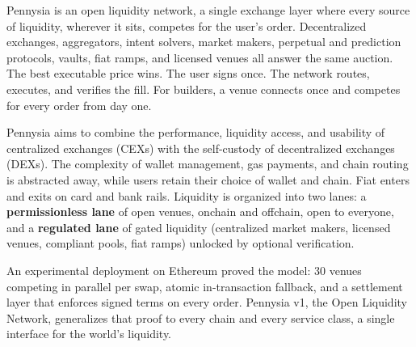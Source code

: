 Pennysia is an open liquidity network, a single exchange layer where every source of liquidity, wherever it sits, competes for the user's order. Decentralized exchanges, aggregators, intent solvers, market makers, perpetual and prediction protocols, vaults, fiat ramps, and licensed venues all answer the same auction. The best executable price wins. The user signs once. The network routes, executes, and verifies the fill. For builders, a venue connects once and competes for every order from day one.

\noindent Pennysia aims to combine the performance, liquidity access, and usability of centralized exchanges (CEXs) with the self-custody of decentralized exchanges (DEXs). The complexity of wallet management, gas payments, and chain routing is abstracted away, while users retain their choice of wallet and chain. Fiat enters and exits on card and bank rails. Liquidity is organized into two lanes: a \textbf{permissionless lane} of open venues, onchain and offchain, open to everyone, and a \textbf{regulated lane} of gated liquidity (centralized market makers, licensed venues, compliant pools, fiat ramps) unlocked by optional verification.

\noindent An experimental deployment on Ethereum proved the model: 30 venues competing in parallel per swap, atomic in-transaction fallback, and a settlement layer that enforces signed terms on every order. Pennysia v1, the Open Liquidity Network, generalizes that proof to every chain and every service class, a single interface for the world's liquidity.
